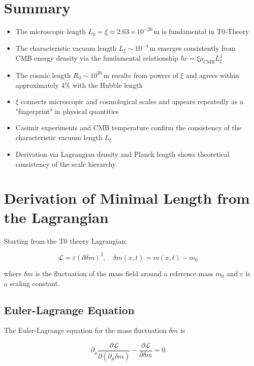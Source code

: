 \documentclass[12pt,a4paper]{article}
\numberwithin{equation}{section}
\begin{document}
	\section{Summary}
	
	\begin{itemize}
		\item The microscopic length $L_0 = \xi \approx 2.63 \times 10^{-20}\,\text{m}$ is fundamental in T0-Theory
		\item The characteristic vacuum length $L_\xi \sim 10^{-4}\,\text{m}$ emerges consistently from CMB energy density via the fundamental relationship $\hbar c = \xi \rho_{\text{CMB}} L_\xi^4$
		\item The cosmic length $R_0 \sim 10^{26}\,\text{m}$ results from powers of $\xi$ and agrees within approximately 4\% with the Hubble length
		\item $\xi$ connects microscopic and cosmological scales and appears repeatedly as a "fingerprint" in physical quantities
		\item Casimir experiments and CMB temperature confirm the consistency of the characteristic vacuum length $L_\xi$
		\item Derivation via Lagrangian density and Planck length shows theoretical consistency of the scale hierarchy
	\end{itemize}
	
	\section{Derivation of Minimal Length from the Lagrangian}
	
	Starting from the T0 theory Lagrangian:
	
	\begin{equation}
		\mathcal{L} = \varepsilon (\partial \delta m)^2, \quad \delta m(x,t) = m(x,t) - m_0
	\end{equation}
	
	where $\delta m$ is the fluctuation of the mass field around a reference mass $m_0$ and $\varepsilon$ is a scaling constant.
	
	\subsection{Euler-Lagrange Equation}
	
	The Euler-Lagrange equation for the mass fluctuation $\delta m$ is
	
	\begin{equation}
		\partial_\mu \frac{\partial \mathcal{L}}{\partial (\partial_\mu \delta m)} - \frac{\partial \mathcal{L}}{\partial \delta m} = 0
	\end{equation}
	
\end{document}
